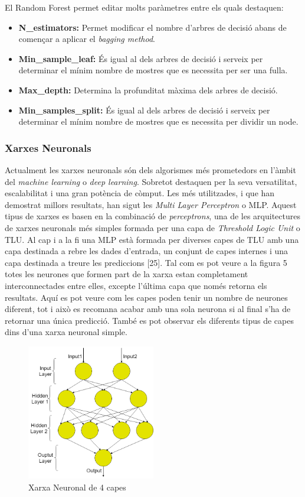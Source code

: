 \documentclass[10pt,a4paper,twocolumn,twoside]{article}
\begin{document}
El Random Forest permet editar molts paràmetres entre els quals destaquen:
\begin{itemize}
\item \textbf{N\_estimators:} Permet modificar el nombre d'arbres de decisió abans de començar a aplicar el \textit{bagging method}.
\item \textbf{Min\_sample\_leaf:} És igual al dels arbres de decisió i serveix per determinar el mínim nombre de mostres que es necessita per ser una fulla.
\item \textbf{Max\_depth:} Determina la profunditat màxima dels arbres de decisió.
\item \textbf{Min\_samples\_split:} És igual al dels arbres de decisió i serveix per determinar el mínim nombre de mostres que es necessita per dividir un node.
\end{itemize}

\subsubsection{Xarxes Neuronals}
Actualment les xarxes neuronals són dels algorismes més prometedors en l'àmbit del \textit{machine learning} o \textit{deep learning}. Sobretot destaquen per la seva versatilitat, escalabilitat i una gran potència de còmput. Les més utilitzades, i que han demostrat millors resultats, han sigut les \textit{Multi Layer Perceptron} o MLP. Aquest tipus de xarxes es basen en la combinació de \textit{perceptrons}, una de les arquitectures de xarxes neuronals més simples formada per una capa de \textit{Threshold Logic Unit} o TLU. Al cap i a la fi una MLP està formada per diverses capes de TLU amb una capa destinada a rebre les dades d'entrada, un conjunt de capes internes i una capa destinada a treure les prediccions [25]. Tal com es pot veure a la figura 5 totes les neurones que formen part de la xarxa estan completament interconnectades entre elles, excepte l'última capa que només retorna els resultats. Aquí es pot veure com les capes poden tenir un nombre de neurones diferent, tot i això es recomana acabar amb una sola neurona si al final s'ha de retornar una única predicció. També es pot observar els diferents tipus de capes dins d'una xarxa neuronal simple.
 \begin{figure}[!h]
\centering
	\includegraphics[width=0.5\textwidth]{../img/XarxaNeur}
	\caption{Xarxa Neuronal de 4 capes}
	\label{fig-XarxaNeur}
\end{figure}
\end{document}
